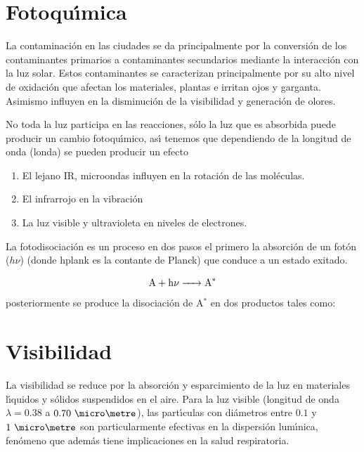 \section{Fotoqu\'{\i}mica}\label{fqm}

La contaminaci\'on en las ciudades se da principalmente por la conversi\'on de los contaminantes primarios a contaminantes secundarios mediante la interacci\'on con la luz solar. Estos contaminantes se caracterizan principalmente por su alto nivel de oxidaci\'on que afectan los materiales, plantas e irritan ojos y garganta. Asimismo influyen en la disminuci\'on de la visibilidad y generaci\'on de olores.

No toda la luz participa en las reacciones, s\'olo la luz que es absorbida puede producir un cambio fotoqu\'{\i}mico, as\'{\i} tenemos que dependiendo de la longitud de onda (\gls{londa}) se pueden producir un efecto
\begin{enumerate}
\item El lejano IR, microondas influyen en la rotaci\'on de las mol\'eculas.
\item El infrarrojo en la vibraci\'on
\item La luz visible y ultravioleta en niveles de electrones.
\end{enumerate}

La fotodisociaci\'on es un proceso en dos pasos el primero la absorci\'on de un fot\'on ($h\nu$) (donde  \gls{hplank}  es la contante de Planck) que conduce a un estado exitado.

 \begin{equation*}
\ce{A + h{\nu}    -> A^* } \end{equation*}
posteriormente se produce la disociaci\'on de A$^*$ en dos productos tales como:
 

\section{Visibilidad}\label{vis2}

La visibilidad se reduce por la absorci\'on y esparcimiento de la luz en materiales l\'{\i}quidos y s\'olidos suspendidos en el aire. Para la luz visible (longitud de onda $\lambda = 0.38$ a $0.70\ \micro\metre$), las part\'{\i}culas con di\'ametros entre $0.1$ y $1\ \micro\metre$ son particularmente efectivas en la dispersi\'on lum\'{\i}nica, fen\'omeno que adem\'as tiene implicaciones en la salud respiratoria.

